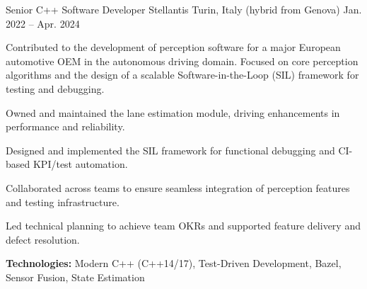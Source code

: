 
\begin{cventries}

  \cventry
  {Senior C++ Software Developer} %
  {Stellantis} %
  {Turin, Italy (hybrid from Genova) } %
  {Jan. 2022 -- Apr. 2024} %
  {
    Contributed to the development of perception software for a major European automotive OEM in the autonomous driving domain. Focused on core perception algorithms and the design of a scalable Software-in-the-Loop (SIL) framework for testing and debugging.
    \vspace{2em}
    \begin{cvitems}
    \item {Owned and maintained the lane estimation module, driving enhancements in performance and reliability.}
    \item {Designed and implemented the SIL framework for functional debugging and CI-based KPI/test automation.}
    \item {Collaborated across teams to ensure seamless integration of perception features and testing infrastructure.}
    \item {Led technical planning to achieve team OKRs and supported feature delivery and defect resolution.}
    \item {\textbf{Technologies:} Modern C++ (C++14/17), Test-Driven Development, Bazel, Sensor Fusion, State Estimation}
    \end{cvitems}
  }



\end{cventries}
